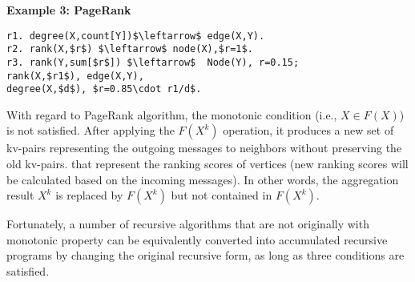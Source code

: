 \textbf{Example 3: PageRank}
\small
\begin{lstlisting}
r1. degree(X,count[Y])$\leftarrow$ edge(X,Y).
r2. rank(X,$r$) $\leftarrow$ node(X),$r=1$.
r3. rank(Y,sum[$r$]) $\leftarrow$  Node(Y), r=0.15;
rank(X,$r1$), edge(X,Y),
degree(X,$d$), $r=0.85\cdot r1/d$.
\end{lstlisting}
\normalsize


With regard to PageRank algorithm, the monotonic condition (i.e., $X\in F(X)$) is not satisfied. After applying the $F(X^{k})$ operation, it produces a new set of kv-pairs representing the outgoing messages to neighbors  without preserving the old kv-pairs. {\color{green}that represent the ranking scores of vertices} (new ranking scores will be calculated based on the incoming messages). In other words, the aggregation result $X^{k}$ is replaced by $F(X^{k})$ but not contained in $F(X^{k})$.

Fortunately, a number of recursive algorithms that are not originally with monotonic property can be equivalently converted into accumulated recursive programs by changing the original recursive form, as long as three conditions are satisfied.



